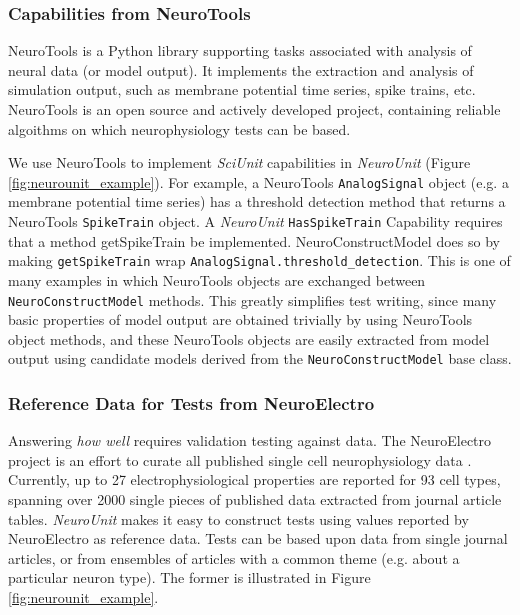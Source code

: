 \documentclass[11pt,letterpaper]{article}
\begin{document}
\subsubsection{Capabilities from NeuroTools}
NeuroTools \cite{neuralensemble_url} is a Python library supporting tasks associated with analysis of neural data (or model output).  It implements the extraction and analysis of simulation output, such as membrane potential time series, spike trains, etc. NeuroTools is an open source and actively developed project, containing reliable algoithms on which neurophysiology tests can be based. 

We use NeuroTools to implement \textit{SciUnit} capabilities in \textit{NeuroUnit} (Figure \ref{fig:neurounit_example}).  For example, a NeuroTools \verb|AnalogSignal| object (e.g. a membrane potential time series) has a threshold detection method that returns a NeuroTools \verb|SpikeTrain| object.  A \textit{NeuroUnit} \verb|HasSpikeTrain| Capability requires that a method getSpikeTrain be implemented.  NeuroConstructModel does so by making \verb|getSpikeTrain| wrap \verb|AnalogSignal.threshold_detection|.  This is one of many examples in which NeuroTools objects are exchanged between \verb|NeuroConstructModel| methods.  This greatly simplifies test writing, since many basic properties of model output are obtained trivially by using NeuroTools object methods, and these NeuroTools objects are easily extracted from model output using candidate models derived from the \verb|NeuroConstructModel| base class.  

\subsubsection{Reference Data for Tests from NeuroElectro}
Answering \textit{how well} requires validation testing against data. The NeuroElectro project \cite{neuroelectro_url} is an effort to curate all published single cell neurophysiology data \cite{tripathy_neuroelectro:_2012}.  Currently, up to 27 electrophysiological properties are reported for 93 cell types, spanning over 2000 single pieces of published data extracted from journal article tables.  \textit{NeuroUnit} makes it easy to construct tests using values reported by NeuroElectro as reference data. Tests can be based upon data from single journal articles, or from ensembles of articles with a common theme (e.g. about a particular neuron type).  The former is illustrated in Figure \ref{fig:neurounit_example}.
\end{document}
